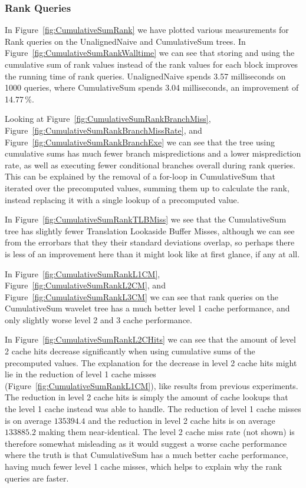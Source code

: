 \subsubsection{Rank Queries}
In Figure~\ref{fig:CumulativeSumRank} we have plotted various measurements for Rank queries on the UnalignedNaive and CumulativeSum trees.
In Figure~\ref{fig:CumulativeSumRankWalltime} we can see that storing and using the cumulative sum of rank values instead of the rank values for each block improves the running time of rank queries.
UnalignedNaive spends 3.57 milliseconds on 1000 queries, where CumulativeSum spends 3.04 milliseconds, an improvement of 14.77\,\%.

Looking at Figure~\ref{fig:CumulativeSumRankBranchMiss}, Figure~\ref{fig:CumulativeSumRankBranchMissRate}, and Figure~\ref{fig:CumulativeSumRankBranchExe} we can see that the tree using cumulative sums has much fewer branch mispredictions and a lower misprediction rate, as well as executing fewer conditional branches overall during rank queries.
This can be explained by the removal of a for-loop in CumulativeSum that iterated over the precomputed values, summing them up to calculate the rank, instead replacing it with a single lookup of a precomputed value.

In Figure~\ref{fig:CumulativeSumRankTLBMiss} we see that the CumulativeSum tree has slightly fewer Translation Lookaside Buffer Misses, although we can see from the errorbars that they their standard deviations overlap, so perhaps there is less of an improvement here than it might look like at first glance, if any at all.

In Figure~\ref{fig:CumulativeSumRankL1CM}, Figure~\ref{fig:CumulativeSumRankL2CM}, and Figure~\ref{fig:CumulativeSumRankL3CM} we can see that rank queries on the CumulativeSum wavelet tree has a much better level 1 cache performance, and only slightly worse level 2 and 3 cache performance.

In Figure~\ref{fig:CumulativeSumRankL2CHits} we can see that the amount of level 2 cache hits decrease significantly when using cumulative sums of the precomputed values.
The explanation for the decrease in level 2 cache hits might lie in the reduction of level 1 cache misses (Figure~\ref{fig:CumulativeSumRankL1CM}), like results from previous experiments.
The reduction in level 2 cache hits is simply the amount of cache lookups that the level 1 cache instead was able to handle.
The reduction of level 1 cache misses is on average $\num{135394.4}$ and the reduction in level 2 cache hits is on average $\num{133885.2}$ making them near-identical.
The level 2 cache miss rate (not shown) is therefore somewhat misleading as it would suggest a worse cache performance where the truth is that CumulativeSum has a much better cache performance, having much fewer level 1 cache misses, which helps to explain why the rank queries are faster.



